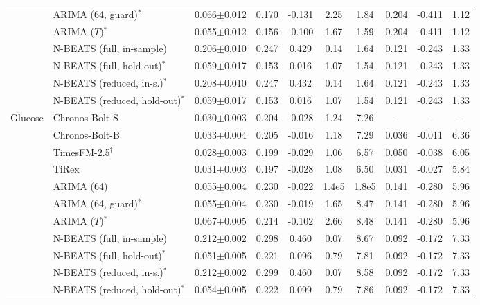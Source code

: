 \begin{tabular}{llcccccccc}
 & ARIMA (64, guard)$^\ast$ & 0.066$\pm$0.012 & 0.170 & -0.131 & 2.25 & 1.84 & 0.204 & -0.411 & 1.12 \\
 & ARIMA ($T$)$^\ast$ & 0.055$\pm$0.012 & 0.156 & -0.100 & 1.67 & 1.59 & 0.204 & -0.411 & 1.12 \\
 & N-BEATS (full, in-sample) & 0.206$\pm$0.010 & 0.247 & 0.429 & 0.14 & 1.64 & 0.121 & -0.243 & 1.33 \\
 & N-BEATS (full, hold-out)$^\ast$ & 0.059$\pm$0.017 & 0.153 & 0.016 & 1.07 & 1.54 & 0.121 & -0.243 & 1.33 \\
 & N-BEATS (reduced, in-s.)$^\ast$ & 0.208$\pm$0.010 & 0.247 & 0.432 & 0.14 & 1.64 & 0.121 & -0.243 & 1.33 \\
 & N-BEATS (reduced, hold-out)$^\ast$ & 0.059$\pm$0.017 & 0.153 & 0.016 & 1.07 & 1.54 & 0.121 & -0.243 & 1.33 \\
\midrule
\multirow{11}{*}{Glucose} & Chronos-Bolt-S & 0.030$\pm$0.003 & 0.204 & -0.028 & 1.24 & 7.26 & -- & -- & -- \\
 & Chronos-Bolt-B & 0.033$\pm$0.004 & 0.205 & -0.016 & 1.18 & 7.29 & 0.036 & -0.011 & 6.36 \\
 & TimesFM-2.5$^\dagger$ & 0.028$\pm$0.003 & 0.199 & -0.029 & 1.06 & 6.57 & 0.050 & -0.038 & 6.05 \\
 & TiRex & 0.031$\pm$0.003 & 0.197 & -0.028 & 1.08 & 6.50 & 0.031 & -0.027 & 5.84 \\
 & ARIMA (64) & 0.055$\pm$0.004 & 0.230 & -0.022 & 1.4e5 & 1.8e5 & 0.141 & -0.280 & 5.96 \\
 & ARIMA (64, guard)$^\ast$ & 0.055$\pm$0.004 & 0.230 & -0.019 & 1.65 & 8.47 & 0.141 & -0.280 & 5.96 \\
 & ARIMA ($T$)$^\ast$ & 0.067$\pm$0.005 & 0.214 & -0.102 & 2.66 & 8.48 & 0.141 & -0.280 & 5.96 \\
 & N-BEATS (full, in-sample) & 0.212$\pm$0.002 & 0.298 & 0.460 & 0.07 & 8.67 & 0.092 & -0.172 & 7.33 \\
 & N-BEATS (full, hold-out)$^\ast$ & 0.051$\pm$0.005 & 0.221 & 0.096 & 0.79 & 7.81 & 0.092 & -0.172 & 7.33 \\
 & N-BEATS (reduced, in-s.)$^\ast$ & 0.212$\pm$0.002 & 0.299 & 0.460 & 0.07 & 8.58 & 0.092 & -0.172 & 7.33 \\
 & N-BEATS (reduced, hold-out)$^\ast$ & 0.054$\pm$0.005 & 0.222 & 0.099 & 0.79 & 7.86 & 0.092 & -0.172 & 7.33 \\
\bottomrule
\end{tabular}
